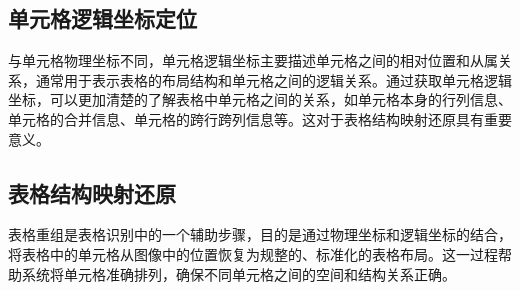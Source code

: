\documentclass[../article.tex]{subfiles} %
\begin{document}
\subsection{单元格逻辑坐标定位}

与单元格物理坐标不同，单元格逻辑坐标主要描述单元格之间的相对位置和从属关系，通常用于表示表格的布局结构和单元格之间的逻辑关系。通过获取单元格逻辑坐标，可以更加清楚的了解表格中单元格之间的关系，如单元格本身的行列信息、单元格的合并信息、单元格的跨行跨列信息等。这对于表格结构映射还原具有重要意义。

\subsection{表格结构映射还原}

表格重组是表格识别中的一个辅助步骤\cite{soft-nms}，目的是通过物理坐标和逻辑坐标的结合，将表格中的单元格从图像中的位置恢复为规整的\cite{hog}、标准化的表格布局。这一过程\cite{vcnn}帮助系统将单元格准确排列\cite{solov2}，确保不同单元格之间的空间和结构关系正确。
\end{document}
